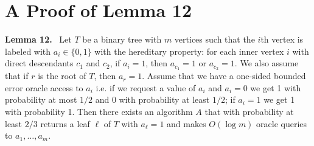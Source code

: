 \documentclass[10pt,a4paper]{article}
\newenvironment{authorclaim}[1]{\par\medskip\noindent\textbf{#1.}\ \ignorespaces}{\par\medskip}
\begin{document}
\section*{A Proof of Lemma 12}
\begin{authorclaim}{Lemma 12}
Let $T$ be a binary tree with $m$ vertices such that the $i$th vertex is labeled with $a_i\in\{0,1\}$ with the hereditary property: for each inner vertex $i$ with direct descendants $c_1$ and $c_2$, if $a_i=1$, then $a_{c_1}=1$ or $a_{c_2}=1$. We also assume that if $r$ is the root of $T$, then $a_r=1$. Assume that we have a one-sided bounded error oracle access to $a_i$ i.e. if we request a value of $a_i$ and $a_i=0$ we get 1 with probability at most $1/2$ and 0 with probability at least $1/2$; if $a_i=1$ we get 1 with probability 1. Then there exists an algorithm $A$ that with probability at least $2/3$ returns a leaf $\ell$ of $T$ with $a_\ell=1$ and makes $O(\log m)$ oracle queries to $a_1,\ldots,a_m$.
\end{authorclaim}
\end{document}
